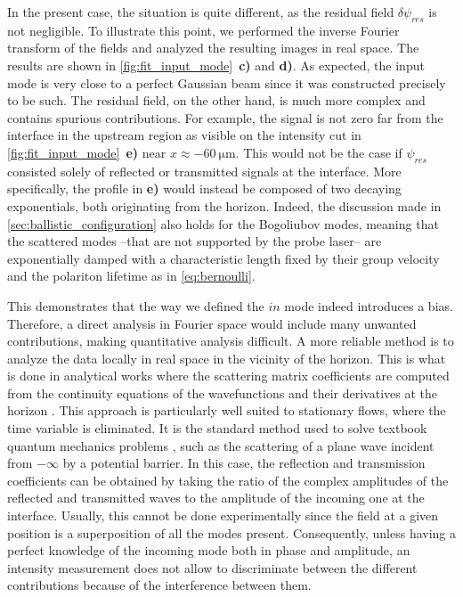 In the present case, the situation is quite different, as the residual field $\delta \psi_{res}$ is not negligible. To illustrate this point, we performed the inverse Fourier transform of the fields and analyzed the resulting images in real space.
The results are shown in \autoref{fig:fit_input_mode}~\textbf{c)} and \textbf{d)}. As expected, the input mode is very close to a perfect Gaussian beam since it was constructed precisely to be such.
The residual field, on the other hand, is much more complex and contains spurious contributions. For example, the signal is not zero far from the interface in the upstream region as visible on the intensity cut in \autoref{fig:fit_input_mode}~\textbf{e)} near $x\approx -\SI{60}{\micro \meter}$. This would not be the case if $\psi_{res}$ consisted solely of reflected or transmitted signals at the interface. More specifically, the profile in \textbf{e)} would instead be composed of two decaying exponentials, both originating from the horizon.
Indeed, the discussion made in \autoref{sec:ballistic_configuration} also holds for the Bogoliubov modes, meaning that the scattered modes --that are not supported by the probe laser--
are exponentially damped with a characteristic length fixed by their group velocity and the polariton lifetime as in \autoref{eq:bernoulli}.


This demonstrates that the way we defined the $in$ mode indeed introduces a bias. Therefore, a direct analysis in Fourier space would include many unwanted contributions, making quantitative analysis difficult. 
A more reliable method is to analyze the data locally in real space in the vicinity of the horizon. This is what is done in analytical works \cite{Recati_acousticHR_2009,carusotto_fluidlightproposal_2012} where the scattering matrix coefficients are computed from the continuity equations of the wavefunctions and their derivatives at the horizon \cite{rot_supperradiance_delhom}. This approach is particularly well suited to stationary flows, where the time variable is eliminated. It is the standard method used to solve textbook quantum mechanics problems \cite{CCT_tome1}, such as the scattering of a plane wave incident from $-\infty$ by a potential barrier. In this case, the reflection and transmission coefficients can be obtained by taking the ratio of the complex amplitudes of the reflected and transmitted waves to the amplitude of the incoming one at the interface. Usually, this cannot be done experimentally since the field at a given position is a superposition of all the modes present. Consequently, unless having a perfect knowledge of the incoming mode both in phase and amplitude, an intensity measurement does not allow to discriminate between the different contributions because of the interference between them.


